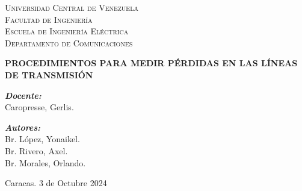 \begin{titlepage}


\centering

\textsc{\large Universidad Central de Venezuela} \\
\textsc{\large Facultad de Ingeniería} \\
\textsc{\large Escuela de Ingeniería Eléctrica} \\
\textsc{\large Departamento de Comunicaciones}\\

\vspace{7cm}


    {\huge \bfseries PROCEDIMIENTOS PARA MEDIR PÉRDIDAS EN LAS LÍNEAS DE TRANSMISIÓN}

\vspace{8cm}



\begin{minipage}{0.4\textwidth}
    \begin{flushleft}
        \emph{\bfseries Docente:}\\
        Caropresse, Gerlis. \\
    \end{flushleft}
\end{minipage}
\begin{minipage}{0.4\textwidth}
    \begin{flushright}
        \emph{\bfseries Autores:}\\
        Br. López, Yonaikel. \\
        Br. Rivero, Axel. \\
        Br. Morales, Orlando.
    \end{flushright}
\end{minipage}





\vfill

{\large Caracas. 3 de Octubre
2024}
\end{titlepage}